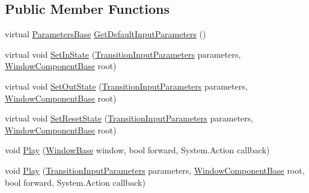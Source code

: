 \subsection*{Public Member Functions}
\begin{DoxyCompactItemize}
\item 
virtual \hyperlink{class_unity_engine_1_1_u_i_1_1_windows_1_1_animations_1_1_transition_base_1_1_parameters_base}{Parameters\+Base} \hyperlink{class_unity_engine_1_1_u_i_1_1_windows_1_1_animations_1_1_transition_base_ad122cb46041f653233be8e3a5150e888}{Get\+Default\+Input\+Parameters} ()
\item 
virtual void \hyperlink{class_unity_engine_1_1_u_i_1_1_windows_1_1_animations_1_1_transition_base_ad8c8aa42bfb52279124999664f820ec9}{Set\+In\+State} (\hyperlink{class_unity_engine_1_1_u_i_1_1_windows_1_1_animations_1_1_transition_input_parameters}{Transition\+Input\+Parameters} parameters, \hyperlink{class_unity_engine_1_1_u_i_1_1_windows_1_1_window_component_base}{Window\+Component\+Base} root)
\item 
virtual void \hyperlink{class_unity_engine_1_1_u_i_1_1_windows_1_1_animations_1_1_transition_base_a5cd4d204d1090e14e92d79d7952841b8}{Set\+Out\+State} (\hyperlink{class_unity_engine_1_1_u_i_1_1_windows_1_1_animations_1_1_transition_input_parameters}{Transition\+Input\+Parameters} parameters, \hyperlink{class_unity_engine_1_1_u_i_1_1_windows_1_1_window_component_base}{Window\+Component\+Base} root)
\item 
virtual void \hyperlink{class_unity_engine_1_1_u_i_1_1_windows_1_1_animations_1_1_transition_base_af9a077b86da9a52fda52a5bf3a93e33d}{Set\+Reset\+State} (\hyperlink{class_unity_engine_1_1_u_i_1_1_windows_1_1_animations_1_1_transition_input_parameters}{Transition\+Input\+Parameters} parameters, \hyperlink{class_unity_engine_1_1_u_i_1_1_windows_1_1_window_component_base}{Window\+Component\+Base} root)
\item 
void \hyperlink{class_unity_engine_1_1_u_i_1_1_windows_1_1_animations_1_1_transition_base_a1cc0e3b72daf7c194a50a58d7dac6dc6}{Play} (\hyperlink{class_unity_engine_1_1_u_i_1_1_windows_1_1_window_base}{Window\+Base} window, bool forward, System.\+Action callback)
\item 
void \hyperlink{class_unity_engine_1_1_u_i_1_1_windows_1_1_animations_1_1_transition_base_a8b4b21a92fc1e99de6a6d4cb90c4fb3a}{Play} (\hyperlink{class_unity_engine_1_1_u_i_1_1_windows_1_1_animations_1_1_transition_input_parameters}{Transition\+Input\+Parameters} parameters, \hyperlink{class_unity_engine_1_1_u_i_1_1_windows_1_1_window_component_base}{Window\+Component\+Base} root, bool forward, System.\+Action callback)

\end{DoxyCompactItemize}
